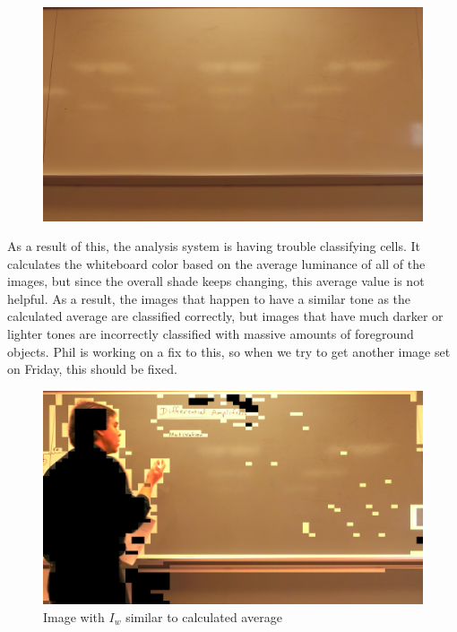 \documentclass[]{article}
\begin{document}
\begin{figure}[H]
\centering
\includegraphics[scale=0.1]{images/colorbalance_3}

\end{figure}		

As a result of this, the analysis system is having trouble classifying cells.  It calculates the whiteboard color based on the average luminance of all of the images, but since the overall shade keeps changing, this average value is not helpful.  As a result, the images that happen to have a similar tone as the calculated average are classified correctly, but images that have much darker or lighter tones are incorrectly classified with massive amounts of foreground objects.  Phil is working on a fix to this, so when we try to get another image set on Friday, this should be fixed.

\begin{figure}[H]
\centering
\includegraphics[scale=0.2]{images/badIw_1}
\caption{Image with $I_w$ similar to calculated average}
\end{figure}	
		
\end{document}
